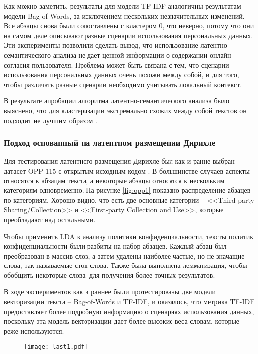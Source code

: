 \documentclass[../main]{subfiles}
\begin{document}
Как можно заметить, результаты для модели TF-IDF аналогичны результатам модели Bag-of-Words, за исключением нескольких незначительных изменений. Все абзацы снова были сопоставлены с кластером 0, что неверно, потому что они на самом деле описывают разные сценарии использования персональных данных. Эти эксперименты позволили сделать вывод, что использование латентно-семантического анализа не дает ценной информации о содержании онлайн-согласия пользователя. Проблема может быть связана с тем, что сценарии использования персональных данных очень похожи между собой, и для того, чтобы различать разные сценарии необходимо учитывать локальный контекст.

В результате апробации алгоритма латентно-семантического анализа было выяснено, что для кластеризации экстремально схожих между собой текстов он подходит не лучшим образом \cite{LETI}.

\subsubsection{Подход основанный на латентном размещении Дирихле}

Для тестирования латентного размещения Дирихле был как и ранне выбран датасет OPP-115 с открытым исходным кодом \cite{MDPI18}. В большинстве случаев аспекты относятся к абзацам текста, а некоторые абзацы относятся к нескольким категориям одновременно. На рисунке \ref{fig:opp1} показано распределение абзацев по категориям. Хорошо видно, что есть две основные категории – <<Third-party Sharing/Collection>> и <<First-party Collection and Use>>, которые преобладают над остальными.

Чтобы применить LDA к анализу политики конфиденциальности, тексты политик конфиденциальности были разбиты на набор абзацев. Каждый абзац был преобразован в массив слов, а затем удалены наиболее частые, но не значащие слова, так называемые стоп-слова. Также была выполнена лемматизация, чтобы обобщить некоторые слова, для получения более точных результатов.

В ходе экспериментов как и раннее были протестированы две модели векторизации текста – Bag-of-Words и TF-IDF, и оказалось, что метрика TF-IDF предоставляет более подробную информацию о сценариях использования данных, поскольку эта модель векторизации дает более высокие веса словам, которые реже используются.

\begin{figure}[H]
    \centering
    {\texttt{[image: last1.pdf]}}
    \vspace{-\baselineskip}
\end{figure}
\end{document}
